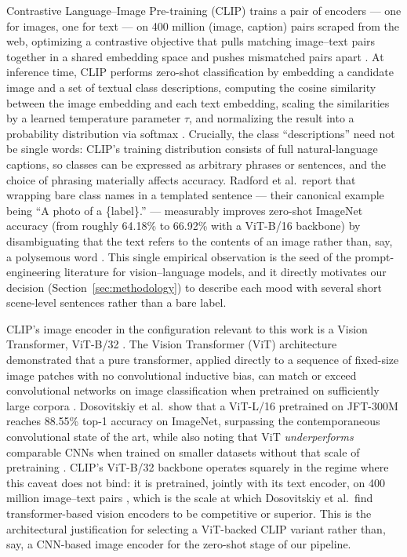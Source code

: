\documentclass[10pt,twocolumn,letterpaper]{article}
\begin{document}
Contrastive Language--Image Pre-training (CLIP) trains a pair of encoders --- one for images, one for text --- on 400 million (image, caption) pairs scraped from the web, optimizing a contrastive objective that pulls matching image--text pairs together in a shared embedding space and pushes mismatched pairs apart \cite{radford2021clip}. At inference time, CLIP performs zero-shot classification by embedding a candidate image and a set of textual class descriptions, computing the cosine similarity between the image embedding and each text embedding, scaling the similarities by a learned temperature parameter $\tau$, and normalizing the result into a probability distribution via softmax \cite{radford2021clip}. Crucially, the class ``descriptions'' need not be single words: CLIP's training distribution consists of full natural-language captions, so classes can be expressed as arbitrary phrases or sentences, and the choice of phrasing materially affects accuracy. Radford et al.\ report that wrapping bare class names in a templated sentence --- their canonical example being ``A photo of a \{label\}.'' --- measurably improves zero-shot ImageNet accuracy (from roughly 64.18\% to 66.92\% with a ViT-B/16 backbone) by disambiguating that the text refers to the contents of an image rather than, say, a polysemous word \cite{radford2021clip}. This single empirical observation is the seed of the prompt-engineering literature for vision--language models, and it directly motivates our decision (Section~\ref{sec:methodology}) to describe each mood with several short scene-level sentences rather than a bare label.

CLIP's image encoder in the configuration relevant to this work is a Vision Transformer, ViT-B/32 \cite{radford2021clip}. The Vision Transformer (ViT) architecture demonstrated that a pure transformer, applied directly to a sequence of fixed-size image patches with no convolutional inductive bias, can match or exceed convolutional networks on image classification when pretrained on sufficiently large corpora \cite{dosovitskiy2021vit}. Dosovitskiy et al.\ show that a ViT-L/16 pretrained on JFT-300M reaches 88.55\% top-1 accuracy on ImageNet, surpassing the contemporaneous convolutional state of the art, while also noting that ViT \emph{underperforms} comparable CNNs when trained on smaller datasets without that scale of pretraining \cite{dosovitskiy2021vit}. CLIP's ViT-B/32 backbone operates squarely in the regime where this caveat does not bind: it is pretrained, jointly with its text encoder, on 400 million image--text pairs \cite{radford2021clip}, which is the scale at which Dosovitskiy et al.\ find transformer-based vision encoders to be competitive or superior. This is the architectural justification for selecting a ViT-backed CLIP variant rather than, say, a CNN-based image encoder for the zero-shot stage of our pipeline.
\end{document}
